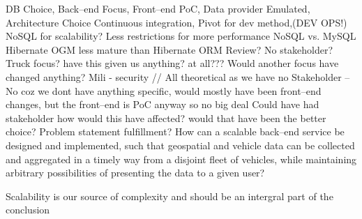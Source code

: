 DB Choice, Back--end Focus, Front--end PoC, Data provider Emulated,
Architecture Choice
Continuous integration, Pivot for dev method,(DEV OPS!)
NoSQL for scalability?
Less restrictions for more performance
NoSQL vs. MySQL
Hibernate OGM less mature than Hibernate ORM
Review?
No stakeholder?
Truck focus? have this given us anything? at all???
Would another focus have changed anything? Mili - security // All theoretical as we have no Stakeholder -- No coz we dont have anything specific, would mostly have been front--end changes, but the front--end is PoC anyway so no big deal
Could have had stakeholder how would this have affected? would that have been the better choice?
Problem statement fulfillment?
How can a scalable back–end service be designed and implemented, such that geospatial
and vehicle data can be collected and aggregated in a timely way from a disjoint fleet
of vehicles, while maintaining arbitrary possibilities of presenting the data to a given user?

Scalability is our source of complexity and should be an intergral part of the conclusion
